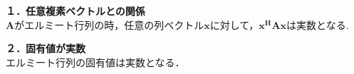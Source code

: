 \vspace{5mm}
\noindent\textbf{１．任意複素ベクトルとの関係} \\
$\bm{A}$がエルミート行列の時，任意の列ベクトル$\bm{x}$に対して，$\bm{x^HAx}$は実数となる.\\

\vspace{5mm}
\noindent\textbf{２．固有値が実数} \\
エルミート行列の固有値は実数となる． \\

